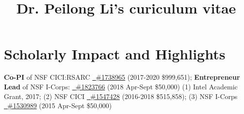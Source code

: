 \documentclass[11pt]{moderncv}
\title{Dr. Peilong Li's curiculum vitae}
\begin{document}
\maketitle

\section{Scholarly Impact and Highlights}
%
{\small \textbf{Co-PI} of NSF CICI:RSARC \href{https://nsf.gov/awardsearch/showAward?AWD_ID=1738965}
  {\color{color1}\homepagesymbol~\#1738965} (2017-2020 \$999,651);\newline
\textbf{Entrepreneur Lead} of NSF I-Corps: \href{https://nsf.gov/awardsearch/showAward?AWD_ID=1823766}
  {\color{color1}\homepagesymbol~\#1823766} (2018 Apr-Sept \$50,000)}
%
%
{\small 
  (1) Intel Academic Grant, 2017; \newline
  (2) NSF CICI \href{https://www.nsf.gov/awardsearch/showAward?AWD_ID=1547428}
  {\color{color1}\homepagesymbol~\#1547428} (2016-2018 \$515,858); \newline 
  (3) NSF I-Corps \href{https://www.nsf.gov/awardsearch/showAward?AWD_ID=1530989}
    {\color{color1}\homepagesymbol~\#1530989} (2015 Apr-Sept \$50,000)
}
%
%
\end{document}
